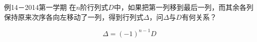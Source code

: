 \begin{frame}
  \begin{footnotesize}
    \begin{exampleblock}{例14－2014第一学期}
      在$n$阶行列式$D$中，如果把第一列移到最后一列，而其余各列保持原来次序各向左移动了一列，得到行列式$\Delta$，问$\Delta$与$D$有何关系？
    \end{exampleblock}
    \pause\jiename
    $$
    \Delta=(-1)^{n-1}D
    $$
  \end{footnotesize}
\end{frame}


